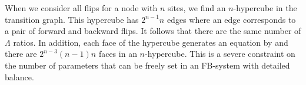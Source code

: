 When we consider all flips for a node with $n$ sites,
we find an $n$-hypercube in the transition graph.
This hypercube has $2^{n-1} n$ edges
where an edge corresponds to a pair of forward and backward flips.
It follows that there are the same number of $\Lambda$ ratios.
In addition, each face of the hypercube generates an equation
by  %
and there are $2^{n-3} (n-1) n$ faces in an $n$-hypercube.
This is a severe constraint on the number of parameters
that can be freely set in an FB-system with detailed balance.






